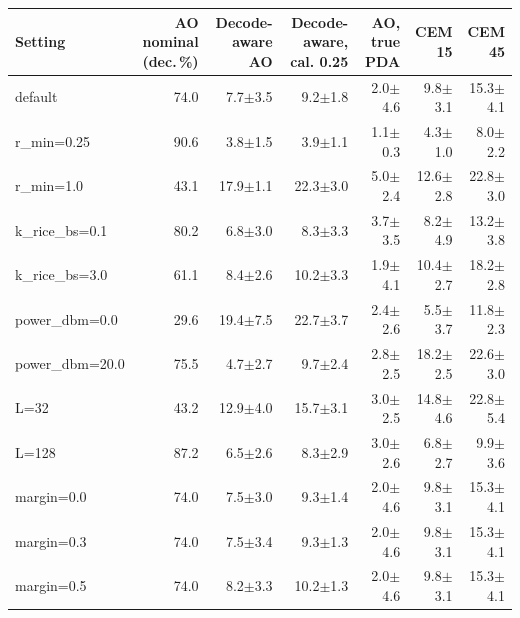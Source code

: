 \begin{tabular}{lrrrrrr}
\toprule
Setting & AO nominal (dec.\,\%) & Decode-aware AO & Decode-aware, cal. 0.25 & AO, true PDA & CEM 15 & CEM 45 \\
\midrule
default & 74.0 & 7.7$\pm$3.5 & 9.2$\pm$1.8 & 2.0$\pm$4.6 & 9.8$\pm$3.1 & 15.3$\pm$4.1 \\
r\_min=0.25 & 90.6 & 3.8$\pm$1.5 & 3.9$\pm$1.1 & 1.1$\pm$0.3 & 4.3$\pm$1.0 & 8.0$\pm$2.2 \\
r\_min=1.0 & 43.1 & 17.9$\pm$1.1 & 22.3$\pm$3.0 & 5.0$\pm$2.4 & 12.6$\pm$2.8 & 22.8$\pm$3.0 \\
k\_rice\_bs=0.1 & 80.2 & 6.8$\pm$3.0 & 8.3$\pm$3.3 & 3.7$\pm$3.5 & 8.2$\pm$4.9 & 13.2$\pm$3.8 \\
k\_rice\_bs=3.0 & 61.1 & 8.4$\pm$2.6 & 10.2$\pm$3.3 & 1.9$\pm$4.1 & 10.4$\pm$2.7 & 18.2$\pm$2.8 \\
power\_dbm=0.0 & 29.6 & 19.4$\pm$7.5 & 22.7$\pm$3.7 & 2.4$\pm$2.6 & 5.5$\pm$3.7 & 11.8$\pm$2.3 \\
power\_dbm=20.0 & 75.5 & 4.7$\pm$2.7 & 9.7$\pm$2.4 & 2.8$\pm$2.5 & 18.2$\pm$2.5 & 22.6$\pm$3.0 \\
L=32 & 43.2 & 12.9$\pm$4.0 & 15.7$\pm$3.1 & 3.0$\pm$2.5 & 14.8$\pm$4.6 & 22.8$\pm$5.4 \\
L=128 & 87.2 & 6.5$\pm$2.6 & 8.3$\pm$2.9 & 3.0$\pm$2.6 & 6.8$\pm$2.7 & 9.9$\pm$3.6 \\
margin=0.0 & 74.0 & 7.5$\pm$3.0 & 9.3$\pm$1.4 & 2.0$\pm$4.6 & 9.8$\pm$3.1 & 15.3$\pm$4.1 \\
margin=0.3 & 74.0 & 7.5$\pm$3.4 & 9.3$\pm$1.3 & 2.0$\pm$4.6 & 9.8$\pm$3.1 & 15.3$\pm$4.1 \\
margin=0.5 & 74.0 & 8.2$\pm$3.3 & 10.2$\pm$1.3 & 2.0$\pm$4.6 & 9.8$\pm$3.1 & 15.3$\pm$4.1 \\
\bottomrule
\end{tabular}

